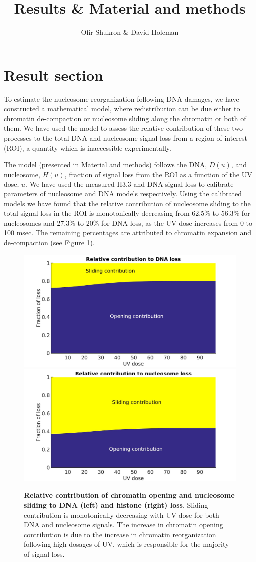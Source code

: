 \documentclass[12pt]{article}
\begin{document}
	
	\title{Results \& Material and methods}
	\author{Ofir Shukron \& David Holcman}
	\maketitle
	
	\section{Result section}
	To estimate the nucleosome reorganization following DNA damages, we have
	constructed a mathematical model, where redistribution can be due either to chromatin de-compaction or nucleosome sliding along the chromatin or both of them. We have used the model to assess the relative contribution of these two processes to the total DNA and nucleosome signal loss from a region of interest (ROI), a quantity which is inaccessible experimentally.
	
	The model (presented in Material and methods) follows the DNA, $D(u)$,
	and nucleosome, $H(u)$, fraction of signal loss from the ROI as a function of
	the UV dose, $u$. We have used the measured H3.3 and DNA signal loss to
	calibrate parameters of nucleosome and DNA models respectively. Using the calibrated models we have found that the relative contribution
	of nucleosome sliding to the total signal loss in the ROI is monotonically
	decreasing from 62.5\% to 56.3\% for nucleosomes and 27.3\% to 20\% for DNA loss,
	as the UV dose increases from 0 to 100 msec. The remaining percentages are
	attributed to chromatin expansion and de-compaction (see Figure \ref{fig:relatiiveContributionToLoss}).
	
	\begin{figure}[H]
		\includegraphics[width=0.5\linewidth, height=0.3\textheight]{relatiiveContributionToDNALoss}
		\includegraphics[width=0.5\linewidth, height=0.3\textheight]{relativeContributionToHistoneLoss}
		\caption{\textbf{Relative contribution of chromatin opening and nucleosome sliding to DNA (left) and histone (right) loss}. Sliding contribution is monotonically decreasing with UV dose for both DNA and nucleosome signals. The increase in chromatin opening contribution is due to the increase in chromatin reorganization following high dosages of UV, which is responsible for the majority of signal loss.}
		\label{fig:relatiiveContributionToLoss}
	\end{figure}
	
\end{document}
